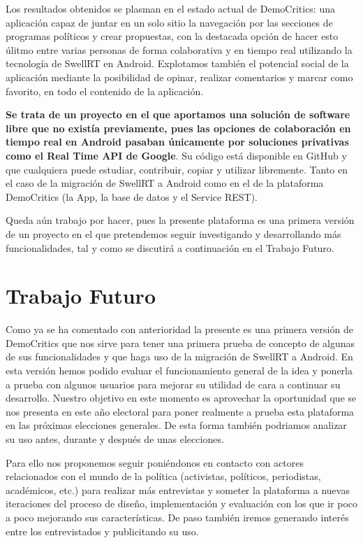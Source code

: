 Los resultados obtenidos se plasman en el estado actual de DemoCritics: una aplicación capaz de juntar en un solo sitio la navegación por las secciones de programas políticos y crear propuestas, con la destacada opción de hacer esto úlitmo entre varias personas de forma colaborativa y en tiempo real utilizando la tecnología de SwellRT en Android. Explotamos también el potencial social de la aplicación mediante la posibilidad de opinar, realizar comentarios y marcar como favorito, en todo el contenido de la aplicación.

\textbf{Se trata de un proyecto en el que aportamos una solución de software libre  que no existía previamente, pues las opciones de colaboración en tiempo real en Android pasaban únicamente por soluciones privativas como el Real Time API de Google}. Su código está disponible en GitHub y que cualquiera puede estudiar, contribuir, copiar y utilizar libremente. Tanto en el caso de la migración de SwellRT a Android como en el de la plataforma DemoCritics (la App, la base de datos y el Service REST). 

Queda aún trabajo por hacer, pues la presente plataforma es una primera versión de un proyecto en el que pretendemos seguir investigando y desarrollando más funcionalidades, tal y como se discutirá a continuación en el Trabajo Futuro. 

\section{Trabajo Futuro}

Como ya se ha comentado con anterioridad la presente es una primera versión de DemoCritics que nos sirve para tener una primera prueba de concepto de algunas de sus funcionalidades y que haga uso de la migración de SwellRT a Android. En esta versión hemos podido evaluar el funcionamiento general de la idea y ponerla a prueba con algunos usuarios para mejorar su utilidad de cara a continuar su desarrollo. Nuestro objetivo en este momento es aprovechar la oportunidad que se nos presenta en este año electoral para poner realmente a prueba esta plataforma en las próximas elecciones generales. De esta forma también podriamos analizar su uso antes, durante y después de unas elecciones.

Para ello nos proponemos seguir poniéndonos en contacto con actores relacionados con el mundo de la política (activistas, políticos, periodistas, académicos, etc.) para realizar más entrevistas y someter la plataforma a nuevas iteraciones del proceso de diseño, implementación y evaluación con los que ir poco a poco mejorando sus características. De paso también iremos generando interés entre los entrevistados y publicitando su uso.

